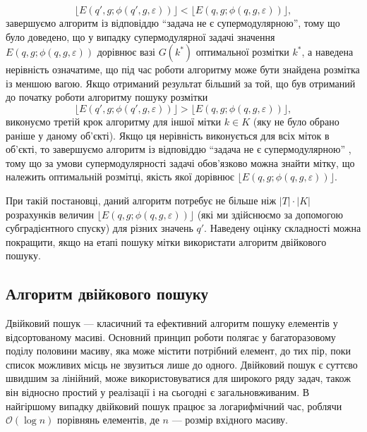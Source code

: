 \begin{enumerate}
\begin{equation*}
        \lfloor E(q',g;\phi(q',g,\varepsilon))\rfloor < \lfloor E(q,g;\phi(q,g,\varepsilon))\rfloor, 
    \end{equation*}
    завершуємо алгоритм із відповіддю ``задача не є супермодулярною'', тому що
    було доведено, що у випадку супермодулярної задачі значення $E(q,g;\phi(q,g,\varepsilon))$ дорівнює 
    вазі $G(k^*)$ оптимальної розмітки $k^*$, а наведена нерівність означатиме, що під час роботи алгоритму може бути знайдена 
    розмітка із меншою вагою. Якщо отриманий результат більший за той, що був отриманий до початку роботи алгоритму пошуку розмітки
    \begin{equation*}
        \lfloor E(q',g;\phi(q',g,\varepsilon))\rfloor > \lfloor E(q,g;\phi(q,g,\varepsilon))\rfloor, 
    \end{equation*}
    виконуємо третій крок алгоритму для іншої мітки $k\in K$ (яку не було обрано раніше у даному об'єкті).
    Якщо ця нерівність виконується для всіх міток в об'єкті, то завершуємо алгоритм із 
    відповіддю ``задача не є супермодулярною''
    , тому що за умови супермодулярності задачі обов'язково можна знайти мітку, що
    належить оптимальній розмітці, якість якої дорівнює $\lfloor E(q,g;\phi(q,g,\varepsilon))\rfloor$.
\end{enumerate}

При такій постановці, даний алгоритм потребує не більше ніж $|T|\cdot|K|$ розрахунків величин 
$\lfloor E(q,g;\phi(q,g,\varepsilon))\rfloor$ (які ми здійснюємо за допомогою субградієнтного спуску) для різних значень $q'$.
Наведену оцінку складності можна покращити, якщо на етапі пошуку мітки використати алгоритм двійкового пошуку.

\subsection{Алгоритм двійкового пошуку}

Двійковий пошук --- класичний та ефективний алгоритм пошуку елементів у відсортованому масиві.
Основний принцип роботи полягає у багаторазовому поділу половини масиву, яка може містити потрібний 
елемент, до тих пір, поки список можливих місць не звузиться лише до одного.
Двійковий пошук є суттєво швидшим за лінійний, може використовуватися для широкого ряду задач, також він відносно простий у реалізації і на сьогодні є
загальновживаним. В найгіршому випадку двійковий пошук працює за логарифмічний час, роблячи $\mathcal{O}(\log n)$ 
порівнянь елементів, де $n$ --- розмір вхідного масиву.


